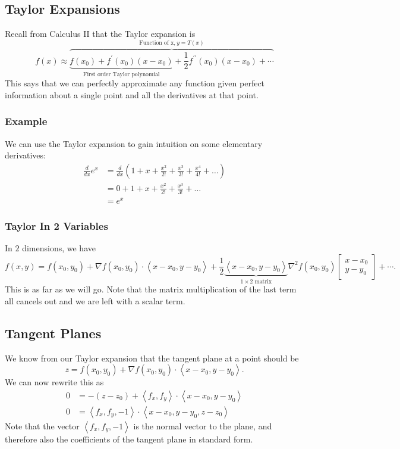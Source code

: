 \documentclass[12pt]{article}
\theoremstyle{plain} %
\theoremstyle{definition}
\theoremstyle{definition}
\theoremstyle{definition}
\theoremstyle{remark}
\newcommand{\half}{\frac{1}{2}}
\newcommand{\angled}[1]{\left\langle {#1} \right\rangle}
\newcommand{\ddx}{\frac{d}{dx}}
\begin{document}
\subsection{Taylor Expansions}
Recall from Calculus II that the Taylor expansion is
\[ f(x) \approx \overbrace{\underbrace{f(x_0) + f^\prime(x_0)(x-x_0)}_{\text{First order Taylor polynomial}} + \frac{1}{2} f^{\prime \prime}(x_0)(x-x_0) + \cdots}^{\text{Function of x,}\  y=T(x)}\]
This says that we can perfectly approximate any function given perfect information about a single point and all the derivatives at that point.
\subsubsection{Example}
We can use the Taylor expansion to gain intuition on some elementary derivatives:
\begin{align*}
    \ddx e^x &= \ddx \left( 1 + x + \frac{x^2}{2!} + \frac{x^3}{3!} + \frac{x^4}{4!} + \dots \right) \\
    &= 0 + 1 + x + \frac{x^2}{2!} + \frac{x^3}{3!} + \dots \\
    &= e^x
\end{align*}
\subsubsection{Taylor In 2 Variables}
In $2$ dimensions, we have
\[ f(x,y) = f(x_0,y_0) + \nabla f(x_0,y_0) \cdot \angled{x-x_0,y-y_0} + \half \underbrace{\angled{x-x_0,y-y_0}}_{1 \times 2 \text{ matrix}} \nabla^2 f(x_0,y_0) \begin{bmatrix} x-x_0 \\ y-y_0 \end{bmatrix} + \cdots. \]
This is as far as we will go. Note that the matrix multiplication of the last term all cancels out and we are left with a scalar term.
\subsection{Tangent Planes}
We know from our Taylor expansion that the tangent plane at a point should be
\[ z = f(x_0,y_0) + \nabla f(x_0,y_0) \cdot \angled{x-x_0,y-y_0}. \]
We can now rewrite this as
\begin{align*}
    0 &= -(z-z_0) + \angled{f_x,f_y} \cdot \angled{x-x_0,y-y_0} \\
    0 &= \angled{f_x,f_y,-1} \cdot \angled{x-x_0,y-y_0,z-z_0}
\end{align*}
Note that the vector $\angled{f_x,f_y,-1}$ is the normal vector to the plane, and therefore also the coefficients of the tangent plane in standard form.
\end{document}
